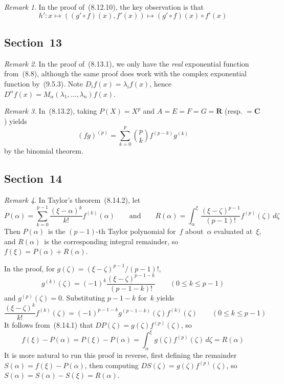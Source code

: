 \documentclass[letterpaper,12pt]{article}
\newcommand{\R}{\mathbf{R}}
\newcommand{\C}{\mathbf{C}}
\newcommand{\after}{\circ}
\newcommand{\dzeta}{\,d\zeta}
\theoremstyle{plain}
\theoremstyle{definition}
\theoremstyle{remark}
\newtheorem*{rmk}{Remark}
\begin{document}
\begin{rmk}
In the proof of~(8.12.10), the key observation is that
\[h':x\mapsto ((g'\after f)(x),f'(x))\mapsto (g'\after f)(x)\after f'(x)\]
\end{rmk}

\subsection*{Section~13}
\begin{rmk}
In the proof of~(8.13.1), we only have the \emph{real} exponential function from~(8.8), although the same proof does work with the complex exponential function by~(9.5.3). Note \(D_if(x)=\lambda_if(x)\), hence \(D^{\alpha}f(x)=M_{\alpha}(\lambda_1,\ldots,\lambda_n)f(x)\).
\end{rmk}

\begin{rmk}
In~(8.13.2), taking \(P(X)=X^p\) and \(A=E=F=G=\R\) (resp. \(=\C\)) yields
\[(fg)^{(p)}=\sum_{k=0}^p\binom{p}{k}f^{(p-k)}g^{(k)}\]
by the binomial theorem.
\end{rmk}

\subsection*{Section~14}
\begin{rmk}
In Taylor's theorem~(8.14.2), let
\[P(\alpha)=\sum_{k=0}^{p-1}\frac{(\xi-\alpha)^k}{k!}f^{(k)}(\alpha)\qquad\text{and}\qquad R(\alpha)=\int_{\alpha}^{\xi}\frac{(\xi-\zeta)^{p-1}}{(p-1)!}f^{(p)}(\zeta)\dzeta\]
Then \(P(\alpha)\)~is the \((p-1)\)-th Taylor polynomial for~\(f\) about~\(\alpha\) evaluated at~\(\xi\), and \(R(\alpha)\)~is the corresponding integral remainder, so \(f(\xi)=P(\alpha)+R(\alpha)\).

In the proof, for \(g(\zeta)=(\xi-\zeta)^{p-1}/(p-1)!\),
\[g^{(k)}(\zeta)=(-1)^k\frac{(\xi-\zeta)^{p-1-k}}{(p-1-k)!}\qquad(0\le k\le p-1)\]
and \(g^{(p)}(\zeta)=0\). Substituting \(p-1-k\) for~\(k\) yields
\[\frac{(\xi-\zeta)^k}{k!}f^{(k)}(\zeta)=(-1)^{p-1-k}g^{(p-1-k)}(\zeta)f^{(k)}(\zeta)\qquad(0\le k\le p-1)\]
It follows from~(8.14.1) that \(DP(\zeta)=g(\zeta)f^{(p)}(\zeta)\), so
\[f(\xi)-P(\alpha)=P(\xi)-P(\alpha)=\int_{\alpha}^{\xi}g(\zeta)f^{(p)}(\zeta)\dzeta=R(\alpha)\]
It is more natural to run this proof in reverse, first defining the remainder \(S(\alpha)=f(\xi)-P(\alpha)\), then computing \(DS(\zeta)=g(\zeta)f^{(p)}(\zeta)\), so \(S(\alpha)=S(\alpha)-S(\xi)=R(\alpha)\).
\end{rmk}
\end{document}
